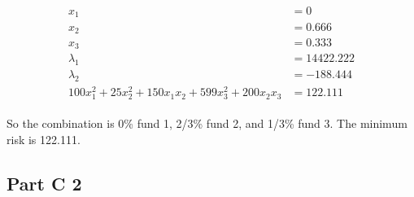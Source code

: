 \documentclass[fleqn,10pt]{wlscirep}
\begin{document}
\begin{align} \begin{split}
    x_{1} &= 0 \\
    x_{2} &= 0.666 \\
    x_{3} &= 0.333 \\
    \lambda_{1} &= 14422.222 \\
    \lambda_{2} &= -188.444 \\
    100 x_{1}^2 + 25 x_{2}^2 + 150 x_{1} x_{2} + 599 x_{3}^2 + 200 x_{2} x_{3} &= 122.111
\end{split} \end{align} 

So the combination is 0\% fund 1, 2/3\% fund 2, and 1/3\% fund 3. The minimum risk is 122.111.

\subsection{Part C 2}
\end{document}
